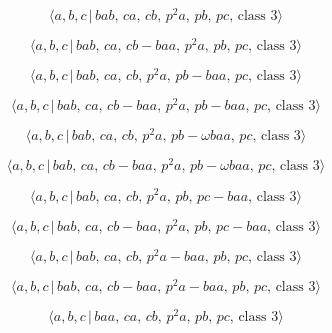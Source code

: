 \documentclass[10pt]{article}
\begin{document}
\begin{equation}
\langle a,b,c\,|\,bab,\,ca,\,cb,\,p^2a,\,pb,\,pc,\,\text{class }3\rangle 
\tag{6.187}
\end{equation}

\begin{equation}
\langle a,b,c\,|\,bab,\,ca,\,cb-baa,\,p^2a,\,pb,\,pc,\,\text{class }3\rangle
\tag{6.188}
\end{equation}

\begin{equation}
\langle a,b,c\,|\,bab,\,ca,\,cb,\,p^2a,\,pb-baa,\,pc,\,\text{class }3\rangle
\tag{6.189}
\end{equation}

\begin{equation}
\langle a,b,c\,|\,bab,\,ca,\,cb-baa,\,p^2a,\,pb-baa,\,pc,\,\text{class }%
3\rangle  \tag{6.190}
\end{equation}

\begin{equation}
\langle a,b,c\,|\,bab,\,ca,\,cb,\,p^2a,\,pb-\omega baa,\,pc,\,\text{class }%
3\rangle  \tag{6.191}
\end{equation}

\begin{equation}
\langle a,b,c\,|\,bab,\,ca,\,cb-baa,\,p^2a,\,pb-\omega baa,\,pc,\,\text{
class }3\rangle  \tag{6.192}
\end{equation}

\begin{equation}
\langle a,b,c\,|\,bab,\,ca,\,cb,\,p^2a,\,pb,\,pc-baa,\,\text{class }3\rangle
\tag{6.193}
\end{equation}

\begin{equation}
\langle a,b,c\,|\,bab,\,ca,\,cb-baa,\,p^2a,\,pb,\,pc-baa,\,\text{class }%
3\rangle  \tag{6.194}
\end{equation}

\begin{equation}
\langle a,b,c\,|\,bab,\,ca,\,cb,\,p^2a-baa,\,pb,\,pc,\,\text{class }3\rangle
\tag{6.195}
\end{equation}

\begin{equation}
\langle a,b,c\,|\,bab,\,ca,\,cb-baa,\,p^2a-baa,\,pb,\,pc,\,\text{class }%
3\rangle  \tag{6.196}
\end{equation}

\begin{equation}
\langle a,b,c\,|\,baa,\,ca,\,cb,\,p^2a,\,pb,\,pc,\,\text{class }3\rangle 
\tag{6.197}
\end{equation}
\end{document}

